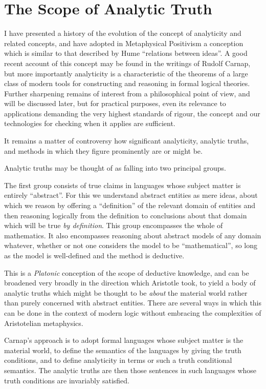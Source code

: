 \section{The Scope of Analytic Truth}

I have presented a history of the evolution of the concept of
analyticity and related concepts, and have adopted in Metaphysical
Positivism a conception which is similar to that described by Hume
``relations between ideas''.
A good recent account of this concept may be found in the writings of
Rudolf Carnap, but more importantly analyticity is a characteristic of
the theorems of a large class of modern tools for constructing and
reasoning in formal logical theories.
Further sharpening remains of interest from a philosophical point of
view, and will be discussed later, but for practical purposes, even
its relevance to applications demanding the very highest standards of
rigour, the concept and our technologies for checking when it applies
are sufficient.

It remains a matter of controversy how significant analyticity,
analytic truths, and methods in which they figure prominently are or
might be.

Analytic truths may be thought of as falling into two principal
groups.

The first group consists of true claims in languages whose subject
matter is entirely ``abstract''.
For this we understand abstract entities as mere ideas, about which we
reason by offering a ``definition'' of the relevant domain of entities
and then reasoning logically from the definition to conclusions about
that domain which will be true \emph{by definition}.
This group encompasses the whole of mathematics.
It also encompasses reasoning about abstract models of any domain
whatever, whether or not one considers the model to be
``mathematical'', so long as the model is well-defined and the method
is deductive.

This is a \emph{Platonic} conception of the scope of deductive
knowledge, and can be broadened very broadly in the direction which
Aristotle took, to yield a body of analytic truths which might be
thought to be \emph{about} the material world rather than purely
concerned with abstract entities.
There are several ways in which this can be done in the context of
modern logic without embracing the complexities of Aristotelian
metaphysics.

Carnap's approach is to adopt formal languages whose subject matter is
the material world, to define the semantics of the languages by giving
the truth conditions, and to define analyticity in terms or such a
truth conditional semantics.
The analytic truths are then those sentences in such languages whose
truth conditions are invariably satisfied.

